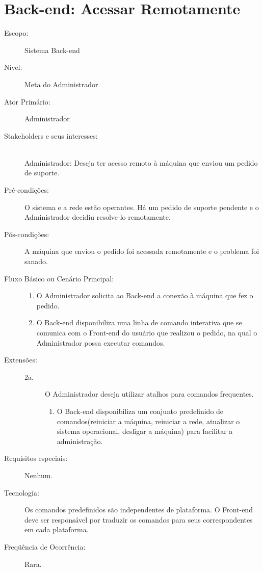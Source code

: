 \documentclass[brazil,times]{abnt}
\begin{document}
\section{Back-end: Acessar Remotamente} \label{Acessar-Remotamente}
\begin{description}
\item[Escopo:] Sistema Back-end
\item[Nível:] Meta do Administrador
\item[Ator Primário:] Administrador
\item[Stakeholders e seus interesses:] \hfill \\
Administrador: Deseja ter acesso remoto à máquina que enviou um pedido de
suporte.

\item[Pré-condições:] O sistema e a rede estão operantes. Há um pedido de suporte pendente e o Administrador decidiu resolve-lo
remotamente.
\item[Pós-condições:] A máquina que enviou o pedido foi acessada remotamente e o
problema foi sanado.
\item[Fluxo Básico ou Cenário Principal:]\hfill
\begin{enumerate}
  \item O Administrador solicita ao Back-end a conexão à máquina que fez o
  pedido.
  \item O Back-end disponibiliza uma linha de comando interativa que se
  comunica com o Front-end do usuário que realizou o pedido, na qual o
  Administrador possa executar comandos.
  
\end{enumerate}

\item[Extensões:]\hfill
\begin{description}
	\item[2a.] O Administrador deseja utilizar atalhos para comandos frequentes.
	\begin{enumerate}
 		\item O Back-end disponibiliza um conjunto predefinido de
  comandos(reiniciar a máquina, reiniciar a rede, atualizar o sistema
  operacional, desligar a máquina) para facilitar a administração.
	\end{enumerate} 

\end{description}
\item[Requisitos especiais:] Nenhum.
\item[Tecnologia:] Os comandos predefinidos são independentes de plataforma. O
Front-end deve ser responsável por traduzir os comandos para seus
correspondentes em cada plataforma.
\item[Freqüência de Ocorrência:] Rara.

\end{description}
\end{document}
